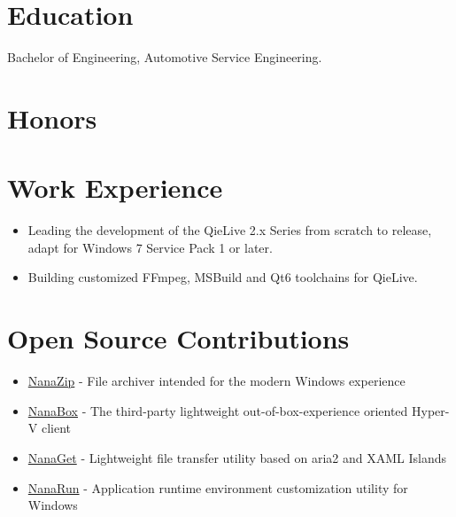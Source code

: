 \documentclass{resume}
\begin{document}
\renewcommand\headrulewidth{0pt}



\section{Education}

  Bachelor of Engineering, Automotive Service Engineering.

\section{Honors}


\section{Work Experience}

\begin{itemize}
  \item Leading the development of the QieLive 2.x Series from scratch to release, adapt for Windows 7 Service Pack 1 or later.
  \item Building customized FFmpeg, MSBuild and Qt6 toolchains for QieLive.
\end{itemize}

\section{Open Source Contributions}

\begin{itemize}
  \item \href{https://github.com/M2Team/NanaZip}{NanaZip} - File archiver intended for the modern Windows experience
  \item \href{https://github.com/M2Team/NanaBox}{NanaBox} - The third-party lightweight out-of-box-experience oriented Hyper-V client
  \item \href{https://github.com/M2Team/NanaGet}{NanaGet} - Lightweight file transfer utility based on aria2 and XAML Islands
  \item \href{https://github.com/M2Team/NanaRun}{NanaRun} - Application runtime environment customization utility for Windows
\end{itemize} 
\end{document}
